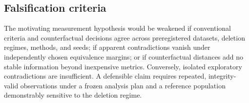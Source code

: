 \subsection{Falsification criteria}
The motivating measurement hypothesis would be weakened if conventional criteria and
counterfactual decisions agree across preregistered datasets, deletion regimes, methods,
and seeds; if apparent contradictions vanish under independently chosen equivalence
margins; or if counterfactual distances add no stable information beyond inexpensive
metrics.  Conversely, isolated exploratory contradictions are insufficient.  A defensible
claim requires repeated, integrity-valid observations under a frozen analysis plan and a
reference population demonstrably sensitive to the deletion regime.
